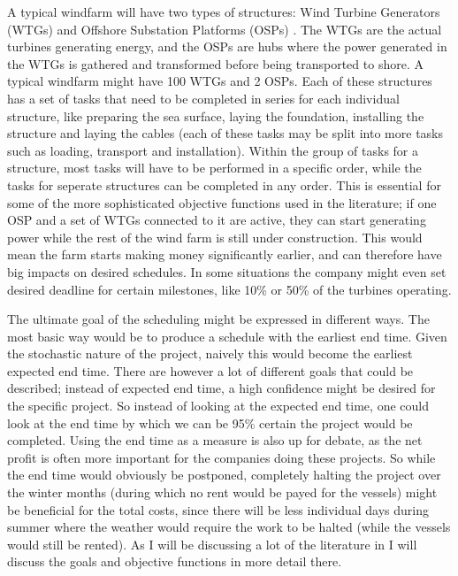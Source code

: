 \documentclass[a4paper,12pt]{article}
\begin{document}
A typical windfarm will have two types of structures: Wind Turbine Generators (WTGs) and Offshore Substation Platforms (OSPs) \cite{barlow2018mixed}. The WTGs are the actual turbines generating energy, and the OSPs are hubs where the power generated in the WTGs is gathered and transformed before being transported to shore. A typical windfarm might have 100 WTGs and 2 OSPs. Each of these structures has a set of tasks that need to be completed in series for each individual structure, like preparing the sea surface, laying the foundation, installing the structure and laying the cables (each of these tasks may be split into more tasks such as loading, transport and installation). Within the group of tasks for a structure, most tasks will have to be performed in a specific order, while the tasks for seperate structures can be completed in any order. This is essential for some of the more sophisticated objective functions used in the literature; if one OSP and a set of WTGs connected to it are active, they can start generating power while the rest of the wind farm is still under construction. This would mean the farm starts making money significantly earlier, and can therefore have big impacts on desired schedules. In some situations the company might even set desired deadline for certain milestones, like 10\% or 50\% of the turbines operating. 

The ultimate goal of the scheduling might be expressed in different ways. The most basic way would be to produce a schedule with the earliest end time. Given the stochastic nature of the project, naively this would become the earliest expected end time. There are however a lot of different goals that could be described; instead of expected end time, a high confidence might be desired for the specific project. So instead of looking at the expected end time, one could look at the end time by which we can be 95\% certain the project would be completed. Using the end time as a measure is also up for debate, as the net profit is often more important for the companies doing these projects. So while the end time would obviously be postponed, completely halting the project over the winter months (during which no rent would be payed for the vessels) might be beneficial for the total costs, since there will be less individual days during summer where the weather would require the work to be halted (while the vessels would still be rented). As I will be discussing a lot of the literature in  I will discuss the goals and objective functions in more detail there. 
\end{document}
